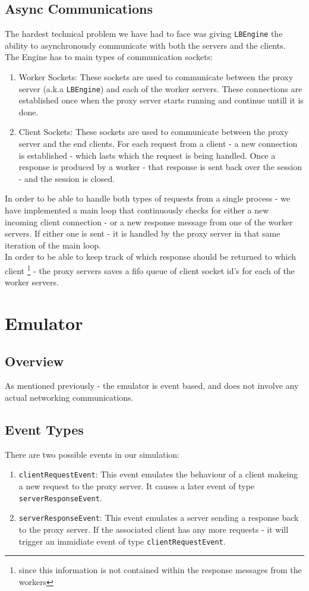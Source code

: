 \documentclass{article}
\begin{document}
\subsection{Async Communications}
The hardest technical problem we have had to face was giving 
\texttt{LBEngine} the ability to asynchronously communicate with both the servers
and the clients.\\
The Engine has to main types of communication sockets:
\begin{enumerate}
    \item Worker Sockets: These sockets are used to communicate between the proxy server (a.k.a \texttt{LBEngine})
    and each of the worker servers. These connections are established once when the proxy server starts running and
    continue untill it is done.
    \item Client Sockets: These sockets are used to communicate between the proxy server and the
    end clients. For each request from a client - a new connection is established - which lasts which the request is being handled.
    Once a response is produced by a worker - that response is sent back over the session - and the session is closed.
\end{enumerate}
In order to be able to handle both types of requests from a single process - we have implemented
a main loop that continuously checks for either a new incoming client connection - or a new response message from
one of the worker servers. If either one is sent - it is handled by the proxy server in that same iteration of the main loop.\\
In order to be able to keep track of which response should be returned to which client
\footnote{since this information is not contained within the response messages from the workers} -
the proxy servers saves a fifo queue of client socket id's for each of the worker servers.

\section{Emulator}
\subsection{Overview}
As mentioned previously - the emulator is event based, and does not
involve any actual networking communications.
\subsection{Event Types}
There are two possible events in our simulation:
\begin{enumerate}
    \item \texttt{clientRequestEvent}: This event emulates the behaviour of a client makeing a new request to the proxy server.
    It causes a later event of type \texttt{serverResponseEvent}.
    \item \texttt{serverResponseEvent}: This event emulates a server sending a response back to the proxy server.
    If the associated client has any more requests - it will trigger an immidiate event of type \texttt{clientRequestEvent}.
\end{enumerate}
\end{document}

